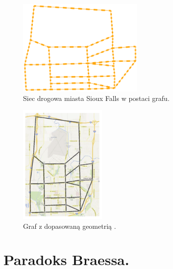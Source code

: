 \documentclass[twoside,12pt]{report}
\begin{document}
\begin{figure}[ht]
\includegraphics[width=0.55\textwidth]{img/graf}
\caption{Siec drogowa miasta Sioux Falls w postaci grafu.} 
\end{figure}

\begin{figure}[ht]
\includegraphics[width=0.38\textwidth]{img/dopasowanie}
\caption{Graf z dopasowaną geometrią \cite{siux}.}
\end{figure}

\section{Paradoks Braessa.}
\end{document}
